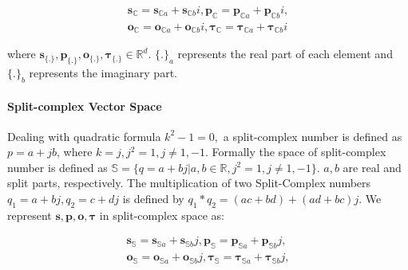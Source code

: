 \documentclass[letterpaper]{article} %
\begin{document}
\begin{equation}
\label{eq:complex}
\begin{aligned}
        \boldsymbol{s_{\mathbb{C}}}=\boldsymbol{s}_{\mathbb{C}a} + \boldsymbol{s}_{\mathbb{C}b}i, \boldsymbol{p_{\mathbb{C}}}=\boldsymbol{p}_{\mathbb{C}a} + \boldsymbol{p}_{\mathbb{C}b}i,  \\ \boldsymbol{o_{\mathbb{C}}}=\boldsymbol{o}_{\mathbb{C}a} + \boldsymbol{o}_{\mathbb{C}b}i, \boldsymbol{\tau_{\mathbb{C}}}=\boldsymbol{\tau}_{\mathbb{C}a} + \boldsymbol{\tau}_{\mathbb{C}b}i
\end{aligned}
\end{equation}

where $\boldsymbol{s}_{\{.\}}, \boldsymbol{p}_{\{.\}}, \boldsymbol{o}_{\{.\}}, \boldsymbol{\tau}_{\{.\}} \in \mathbb{R}^{d}$. ${\{.\}}_{a}$ represents the real part of each element and ${\{.\}}_{b}$ represents the imaginary part.

\paragraph{\textbf{Split-complex Vector Space}}
Dealing with quadratic formula $k^2 - 1 = 0,$ a split-complex number \cite{harkin2004geometry,metahelzer2000special} is defined as $p = a + j b$, where $k = j, j^2 = 1, j \neq 1, -1.$ Formally the space of split-complex number is defined as $\mathbb{S} = \{ q = a + bj | a,b \in \mathbb{R}, j^2 = 1, j \neq 1, -1\}$. $a,b$ are real and split parts, respectively. The multiplication of two Split-Complex numbers $q_1= a+bj, q_2=c+dj$ is defined by $q_1 * q_2 = (ac+ bd) + (ad + bc) j$. We represent $\boldsymbol{s,p,o, \tau}$ in split-complex space as:

\begin{equation}
\label{eq:split}
\begin{aligned}
        \boldsymbol{s_{\mathbb{S}}}=\boldsymbol{s}_{\mathbb{S}a} + \boldsymbol{s}_{\mathbb{S}b}j, \boldsymbol{p_{\mathbb{S}}}=\boldsymbol{p}_{\mathbb{S}a} + \boldsymbol{p}_{\mathbb{S}b}j,  \\
        \boldsymbol{o_{\mathbb{S}}}=\boldsymbol{o}_{\mathbb{S}a} + \boldsymbol{o}_{\mathbb{S}b}j,
        \boldsymbol{\tau_{\mathbb{S}}}=\boldsymbol{\tau}_{\mathbb{S}a} + \boldsymbol{\tau}_{\mathbb{S}b}j,
\end{aligned}
\end{equation}
\end{document}
